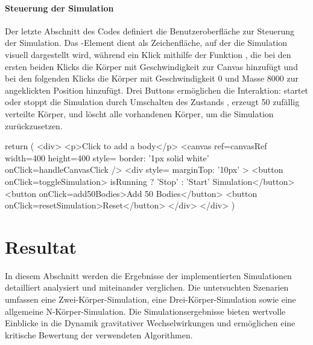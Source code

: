 \documentclass[a4paper,12pt,twoside]{article}
\begin{document}
\paragraph{Steuerung der Simulation}
Der letzte Abschnitt des Codes definiert die Benutzeroberfläche zur Steuerung der Simulation. Das -Element dient als Zeichenfläche, auf der die Simulation visuell dargestellt wird, 
während ein Klick mithilfe der Funktion , die bei den ersten beiden Klicks die Körper mit Geschwindigkeit zur Canvas hinzufügt und bei den folgenden Klicks die Körper mit Geschwindigkeit 0 und Masse 8000 zur angeklickten Position hinzufügt.
Drei Buttons ermöglichen die Interaktion: startet oder stoppt die Simulation durch Umschalten des Zustands ,  erzeugt 50 zufällig verteilte Körper, 
und  löscht alle vorhandenen Körper, um die Simulation zurückzusetzen.


\begin{javascript}
    return (
        <div>
            <p>Click to add a body</p>
            <canvas ref={canvasRef} width={400} height={400} style={{ border: '1px solid white' }} onClick={handleCanvasClick} />
            <div style={{ marginTop: '10px' }}>
                <button onClick={toggleSimulation}> {isRunning ? 'Stop' : 'Start'} Simulation</button>
                <button onClick={add50Bodies}>Add 50 Bodies</button>
                <button onClick={resetSimulation}>Reset</button>
            </div>
        </div>
    )
\end{javascript}


\section{Resultat}

In diesem Abschnitt werden die Ergebnisse der implementierten Simulationen detailliert analysiert und miteinander verglichen. Die untersuchten Szenarien umfassen eine Zwei-Körper-Simulation, eine Drei-Körper-Simulation sowie eine allgemeine N-Körper-Simulation. Die Simulationsergebnisse bieten wertvolle Einblicke in die Dynamik gravitativer Wechselwirkungen und ermöglichen eine kritische Bewertung der verwendeten Algorithmen.
\end{document}
